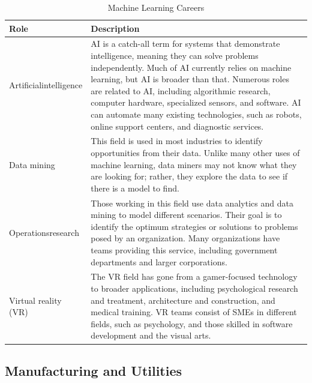 \begin{table}[H]
	\begin{center}
		\caption{Machine Learning Careers}
		\vskip 4pt
		\begin{tabular}{p{1in}|p{3.4in}} 
			\textbf{Role} & \textbf{Description}\\
			\hline
			Artificial\linebreak intelligence & AI is a catch-all term for systems that demonstrate intelligence, meaning they can solve problems independently. Much of AI currently relies on machine learning, but AI is broader than that. Numerous roles are related to AI, including algorithmic research, computer hardware, specialized sensors, and software. AI can automate many existing technologies, such as robots, online support centers, and diagnostic services.\\
			\hline
			Data mining & This field is used in most industries to identify opportunities from their data. Unlike many other uses of machine learning, data miners may not know what they are looking for; rather, they explore the data to see if there is a model to find.\\
			\hline
			Operations\linebreak research & Those working in this field use data analytics and data mining to model different scenarios. Their goal is to identify the optimum strategies or solutions to problems posed by an organization. Many organizations have teams providing this service, including government departments and larger corporations.\\
			\hline
			Virtual reality (VR) & The VR field has gone from a gamer-focused technology to broader applications, including psychological research and treatment, architecture and construction, and medical training. VR teams consist of SMEs in different fields, such as psychology, and those skilled in software development and the visual arts.\\
			\hline
		\end{tabular}
	\end{center}
\end{table}

\subsection{Manufacturing and Utilities}


